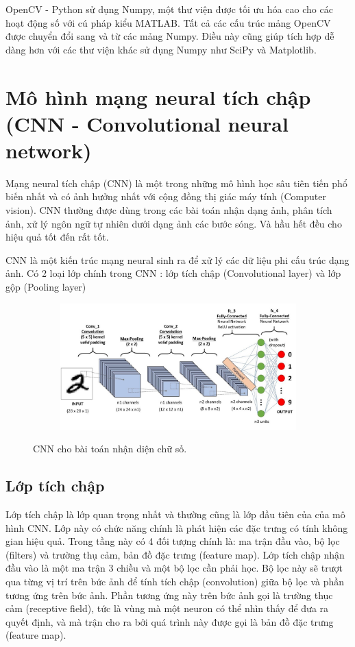 OpenCV - Python sử dụng Numpy, một thư viện được tối ưu hóa cao cho các hoạt động số với
cú pháp kiểu MATLAB. Tất cả các cấu trúc mảng OpenCV được chuyển đổi sang và từ các mảng
Numpy. Điều này cũng giúp tích hợp dễ dàng hơn với các thư viện khác sử dụng Numpy
như SciPy và Matplotlib.



\section{Mô hình mạng neural tích chập (CNN - Convolutional neural network)}

Mạng neural tích chập (CNN) là một trong những mô hình học sâu tiên tiến phổ biến nhất và
có ảnh hưởng nhất với cộng đồng thị giác máy tính (Computer vision). CNN thường được dùng
trong các bài toán nhận dạng ảnh, phân tích ảnh, xử lý ngôn ngữ tự nhiên dưới dạng ảnh các bước sóng.
Và hầu hết đều cho hiệu quả tốt đến rất tốt.

CNN là một kiến trúc mạng neural sinh ra để xử lý các dữ liệu phi cấu trúc dạng ảnh. Có 2 loại lớp
chính trong CNN : lớp tích chập (Convolutional layer) và lớp gộp (Pooling layer)

\begin{figure}
    \begin{subfigure}{1.\textwidth}
        \includegraphics[width=1.\linewidth]{Chapters/items/cnn2_1.jpg}
        \label{fig:chap2_2}
    \end{subfigure}
    \caption{CNN cho bài toán nhận diện chữ số.}
\end{figure}
\subsection{Lớp tích chập}

Lớp tích chập là lớp quan trọng nhất và thường cũng là lớp đầu tiên của của mô hình CNN.
Lớp này có chức năng chính là phát hiện các đặc trưng có tính không gian hiệu quả.
Trong tầng này có 4 đối tượng chính là: ma trận đầu vào, bộ lọc (filters) và trường thụ cảm,
bản đồ đặc trưng (feature map). Lớp tích chập nhận đầu vào là một ma trận 3 chiều và một bộ lọc cần phải học.
Bộ lọc này sẽ trượt qua từng vị trí trên bức ảnh để tính tích chập (convolution)
giữa bộ lọc và phần tương ứng trên bức ảnh. Phần tương ứng này trên bức ảnh gọi là
trường thục cảm (receptive field), tức là vùng mà một neuron có thể nhìn thấy để đưa
ra quyết định, và mà trận cho ra bởi quá trình này được gọi là bản đồ đặc trưng (feature map).

